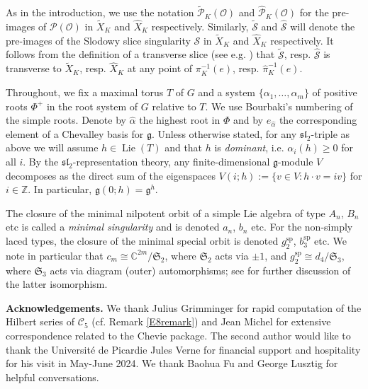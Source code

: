 \documentclass{amsart}
\theoremstyle{definition}
\DeclareMathOperator{\Lie}{Lie}
\def\sp{\mathrm{sp}}
\newcommand{\C}{\mathbb{C}}
\newcommand{\g}{\mathfrak{g}}
\newcommand{\0}{\mathcal{O}}
\begin{document}
As in the introduction, we use the notation $\widetilde{\mathcal P}_K(\0)$ and $\hat{\mathcal P}_K(\0)$ for the pre-images of ${\mathcal P}(\0)$ in $\widetilde{X}_K$ and $\hat{X}_K$ respectively. 
Similarly, $\widetilde{\mathcal S}$ and $\hat{\mathcal S}$ will denote the pre-images of the Slodowy slice singularity ${\mathcal S}$ in $\widetilde{X}_K$ and $\hat{X}_K$ respectively.
It follows from the definition of a transverse slice (see e.g. \cite[\S 5.1]{Slodowy:book}) that $\widetilde{\mathcal S}$, resp. $\hat{\mathcal S}$ is transverse to $\widetilde{X}_K$, resp. $\hat{X}_K$ at any point of $\pi_K^{-1}(e)$, resp. $\hat\pi_K^{-1}(e)$.

Throughout, we fix a maximal torus $T$ of $G$ and a system $\{ \alpha_1,\ldots ,\alpha_m\}$ of positive roots $\Phi^+$ in the root system of $G$ relative to $T$.
We use Bourbaki's numbering of the simple roots.
Denote by $\hat\alpha$ the highest root in $\Phi$ and by $e_{\hat\alpha}$ the corresponding element of a Chevalley basis for $\g$.
Unless otherwise stated, for any $\mathfrak{sl}_2$-triple as above we will assume $h\in\Lie(T)$ and that $h$ is {\it dominant}, i.e. $\alpha_i(h)\geq 0$ for all $i$.
By the $\mathfrak{sl}_2$-representation theory, any finite-dimensional $\g$-module $V$ decomposes as the direct sum of the eigenspaces $V(i;h):= \{ v\in V : h\cdot v=iv\}$ for $i\in{\mathbb Z}$.
In particular, $\g(0;h)=\g^h$.

The closure of the minimal nilpotent orbit of a simple Lie algebra of type $A_n$, $B_n$ etc is called a {\it minimal singularity} and is denoted $a_n$, $b_n$ etc.
For the non-simply laced types, the closure of the minimal special orbit is denoted $g_2^{\sp}$, $b_3^{\sp}$ etc.
We note in particular that $c_m\cong \C^{2m}/\mathfrak{S}_2$, where $\mathfrak{S}_2$ acts via $\pm 1$, and $g_2^{\sp}\cong d_4/\mathfrak{S}_3$, where $\mathfrak{S}_3$ acts via diagram (outer) automorphisms; see \cite[2.3.5]{FJLS23} for further discussion of the latter isomorphism.


\vspace{0.3cm}
\noindent
{\bf Acknowledgements.}
We thank Julius Grimminger for rapid computation of the Hilbert series of ${\mathcal C}_5$ (cf. Remark \ref{E8remark}) and Jean Michel for extensive correspondence related to the Chevie package.
The second author would like to thank the Universit\'e de Picardie Jules Verne for financial support and hospitality for his visit in May-June 2024.
We thank Baohua Fu and George Lusztig for helpful conversations.
\end{document}

